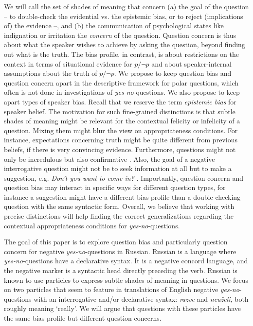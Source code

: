 \documentclass[output=paper,colorlinks,citecolor=brown]{langscibook}
\begin{document}
We will call the set of shades of meaning that concern (a) the goal of the question – to double-check the evidential vs. the epistemic bias, or to reject (implications of) the evidence –, and (b) the communication of psychological states like indignation or irritation the \textit{concern} of the question. Question concern is thus about what the speaker wishes to achieve by asking the question, beyond finding out what is the truth. The bias profile, in contrast, is about restrictions on the context in terms of situational evidence for $p/\neg p$ and about speaker-internal assumptions about the truth of $p / \neg p$. We propose to keep question bias and question concern apart in the descriptive framework for polar questions, which often is not done in investigations of \textit{yes-no}-questions. We also propose to keep apart types of speaker bias. Recall that we reserve the term \textit{epistemic bias} for speaker belief. The motivation for such fine-grained distinctions is that subtle shades of meaning might be relevant for the contextual felicity or infelicity of a question. Mixing them might blur the view on appropriateness conditions. For instance, expectations concerning truth might be quite different from previous beliefs, if there is very convincing evidence. Furthermore, questions might not only be incredulous but also confirmative \citep{jeong18, rudin18, goodhue21:lsa}. Also, the goal of a negative interrogative question might not be to seek information at all but to make a suggestion, e.g. \textit{Don't you want to come in?} \citep{romerohan2004negative, anderbois2019}. Importantly, question concern and question bias may interact in specific ways for different question types, for instance a suggestion might have a different bias profile than a double-checking question with the same syntactic form. Overall, we believe that working with precise distinctions will help finding the correct generalizations regarding the contextual appropriateness conditions for \textit{yes-no}-questions.

The goal of this paper is to explore question bias and particularly question concern for negative \textit{yes-no}-questions in Russian. Russian is a language where \textit{yes-no}-questions have a declarative syntax. It is a negative concord language, and the negative marker is a syntactic head directly preceding the verb. Russian is known to use particles to express subtle shades of meaning in questions. We focus on two particles that seem to feature in translations of English negative \textit{yes-no}-questions with an interrogative and/or declarative syntax: \textit{razve} and \textit{neuželi}, both roughly meaning `really'. We will argue that questions with these particles have the same bias profile but different question concerns.
\end{document}
